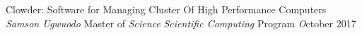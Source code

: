 \documentclass[letterpaper,12pt]{report}
\begin{document}

\thesistitle
{
	 Clowder:  Software for Managing Cluster Of High Performance Computers  }
	{\emph{Samson Ugwuodo}}
	{Master of \emph{Science}}
	{ \emph{Scientific Computing} Program}
	{\emph October 2017} 














\end{document}
